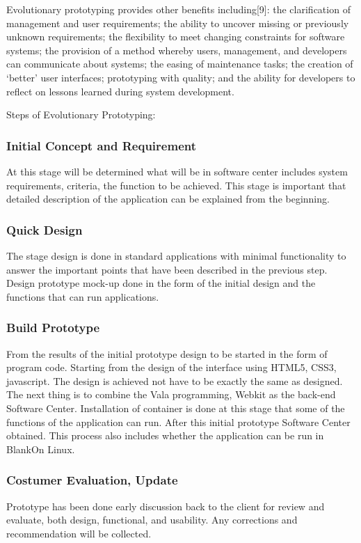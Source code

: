 \documentclass[conference, letterpaper]{IEEEtran}
\begin{document}
Evolutionary prototyping provides other benefits including[9]: the clarification of management and user requirements; the ability to uncover missing or previously unknown requirements; the flexibility to meet changing constraints for software systems; the provision of a method whereby users, management, and developers can communicate about systems; the easing of maintenance tasks; the creation of ‘better’ user interfaces; prototyping with quality; and the ability for developers to reflect on lessons learned during system development.

Steps of Evolutionary Prototyping:
\subsubsection{Initial Concept and Requirement}
At this stage will be determined what will be in software center includes system requirements,  criteria, the function to be achieved. This stage is important that detailed description of the application can be explained from the beginning.

\subsubsection{Quick Design}
The stage design is done in standard applications with minimal functionality to answer the important points that have been described in the previous step. Design prototype mock-up done in the form of the initial design and the functions that can run applications.

\subsubsection{Build Prototype}
From the results of the initial prototype design to be started in the form of program code. Starting from the design of the interface using HTML5, CSS3, javascript. The design is achieved not have to be exactly the same as designed. The next thing is to combine the Vala programming, Webkit as the back-end Software Center. Installation of container is done at this stage that some of the functions of the application can run. After this initial prototype Software Center obtained. This process also includes whether the application can be run
in BlankOn Linux.

\subsubsection{Costumer Evaluation, Update}
Prototype has been done early discussion back to the client for review and evaluate, both design, functional, and usability. Any corrections and recommendation will be collected.
\end{document}
